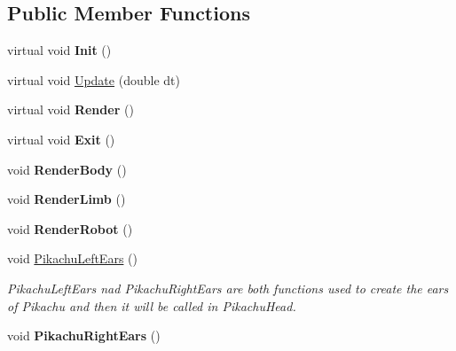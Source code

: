 \subsection*{Public Member Functions}
\begin{DoxyCompactItemize}
\item 
\hypertarget{class_scene_light_a9efc7124efacb45a7cce730688bf20e9}{virtual void {\bfseries Init} ()}\label{class_scene_light_a9efc7124efacb45a7cce730688bf20e9}

\item 
virtual void \hyperlink{class_scene_light_a23681b3a667399752645d5763ddc72a7}{Update} (double dt)
\item 
\hypertarget{class_scene_light_a9088eb7ba6a1d55ebe9e0094c67281bf}{virtual void {\bfseries Render} ()}\label{class_scene_light_a9088eb7ba6a1d55ebe9e0094c67281bf}

\item 
\hypertarget{class_scene_light_afe406a984481b2bc235c445beb2165f9}{virtual void {\bfseries Exit} ()}\label{class_scene_light_afe406a984481b2bc235c445beb2165f9}

\item 
\hypertarget{class_scene_light_a308b74cd5d6e958ca12bd698e2dcd2b8}{void {\bfseries Render\+Body} ()}\label{class_scene_light_a308b74cd5d6e958ca12bd698e2dcd2b8}

\item 
\hypertarget{class_scene_light_aa125d25f061fc64d484d7f18266f0aaa}{void {\bfseries Render\+Limb} ()}\label{class_scene_light_aa125d25f061fc64d484d7f18266f0aaa}

\item 
\hypertarget{class_scene_light_a9da10b516c791c3a2cf5c2faec7f38bc}{void {\bfseries Render\+Robot} ()}\label{class_scene_light_a9da10b516c791c3a2cf5c2faec7f38bc}

\item 
void \hyperlink{class_scene_light_aee8ec7a58c9f640e37868992f497d0ce}{Pikachu\+Left\+Ears} ()
\begin{DoxyCompactList}\small\item\em Pikachu\+Left\+Ears nad Pikachu\+Right\+Ears are both functions used to create the ears of Pikachu and then it will be called in Pikachu\+Head. \end{DoxyCompactList}\item 
\hypertarget{class_scene_light_ae877dac3bd1285d70c45a715ea952dfe}{void {\bfseries Pikachu\+Right\+Ears} ()}\label{class_scene_light_ae877dac3bd1285d70c45a715ea952dfe}


\end{DoxyCompactItemize}
